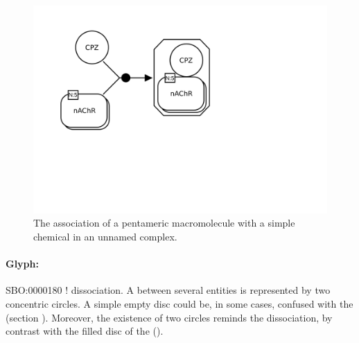 \begin{figure}[htb]
  \centering
  \includegraphics[scale = 0.3]{examples/association-unamed}
  \caption{The association of a pentameric macromolecule with a simple chemical in an unnamed complex.}
  \label{fig:techref:assoc-unamed}
\end{figure}



\paragraph{Glyph: }\label{sec:techref:dissociation}

\begin{glyphDescription}
 \glyphSboTerm SBO:0000180 ! dissociation.
 \glyphNode A  between several entities is represented by two concentric circles. A simple empty disc could be, in some cases, confused with the  (section ). Moreover, the existence of two circles reminds the dissociation, by contrast with the filled disc of the  ().
 \end{glyphDescription}


